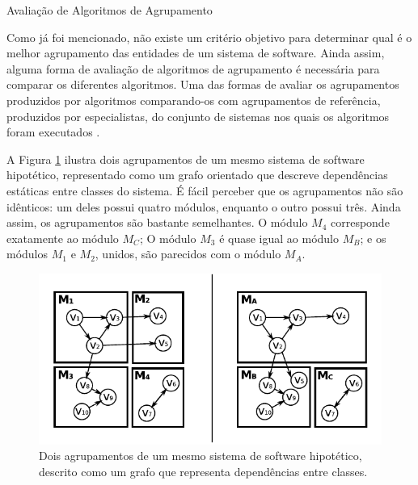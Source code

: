 \begin{section}{Avaliação de Algoritmos de Agrupamento}

Como já foi mencionado, não existe um critério objetivo para determinar qual é o melhor agrupamento das entidades de um sistema de software. Ainda assim, alguma forma de avaliação de algoritmos de agrupamento é necessária para comparar os diferentes algoritmos. Uma das formas de avaliar os agrupamentos produzidos por algoritmos comparando-os com agrupamentos de referência, produzidos por especialistas, do conjunto de sistemas nos quais os algoritmos foram executados \cite{Koschke2000}.

A Figura \ref{fig:mojo} ilustra dois agrupamentos de um mesmo sistema de software hipotético, representado como um grafo orientado que descreve dependências estáticas entre classes do sistema. É fácil perceber que os agrupamentos não são idênticos: um deles possui quatro módulos, enquanto o outro possui três. Ainda assim, os agrupamentos são bastante semelhantes. O módulo $M_4$ corresponde exatamente ao módulo $M_C$; O módulo $M_3$ é quase igual ao módulo $M_B$; e os módulos $M_1$ e $M_2$, unidos, são parecidos com o módulo $M_A$.

\begin{figure}[htbp]
	\centering
		\includegraphics[scale=1]{figuras/redes-dupla}
	\caption{Dois agrupamentos de um mesmo sistema de software hipotético, descrito como um grafo que representa dependências entre classes.}
	\label{fig:mojo}
\end{figure}



\end{section}
